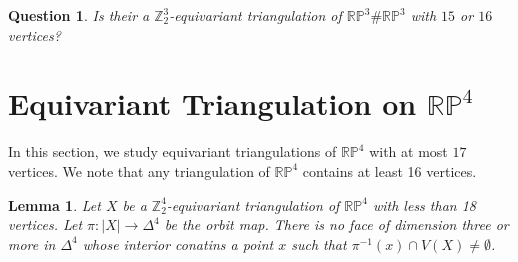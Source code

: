 \documentclass[11pt]{amsart}
\numberwithin{equation}{section}
\newtheorem{lemma}[theorem]{Lemma}
\newtheorem{question}[theorem]{Question}
\theoremstyle{definition}
\newcommand{\RP}{\mathbb{RP}}
\newcommand{\D}{\Delta}
\def \bb{\mathbb}
\def \ZZ{{\bb{Z}}}
\begin{document}
\begin{question}
    Is their a $\ZZ_2^3$-equivariant triangulation of $\RP^3\#\RP^3$ with $15$  or $16$ vertices?
\end{question}



\section{Equivariant Triangulation on $\mathbb{RP}^4$}\label{sec:RP4}
In this section, we study equivariant triangulations of $\RP^4$ with at most $17$ vertices. We note that any triangulation of $\RP^4$ contains at least 16 vertices.  


\begin{lemma}\label{lem:nointerior}
   Let $X$ be a $\ZZ_2^4$-equivariant triangulation of $\RP^4$ with less than 18 vertices. Let $\pi:|X|\rightarrow \D^4$ be the orbit map. There is no face of dimension three or more in $\D^4$ whose interior conatins a point $x$ such that $\pi^{-1}(x) \cap V(X) \neq \emptyset$. 
\end{lemma}
\end{document}
